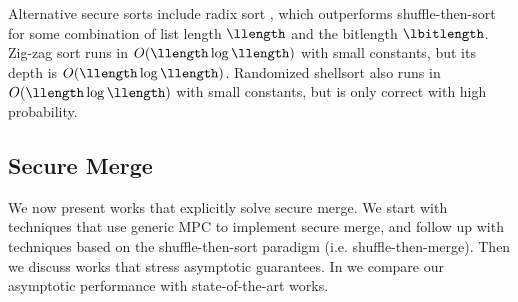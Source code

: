 


Alternative secure sorts include radix sort \cite{EPRINT:HICT14,EPRINT:CHIKKP19}, which outperforms shuffle-then-sort for some combination of list length $\llength$ and the bitlength $\lbitlength$. %
Zig-zag sort \cite{STOC:Goodrich14} runs in $O(\llength\log\llength)$ with small constants, but its depth is $O(\llength\log\llength)$.
Randomized shellsort \cite{SODA:Goodrich10} also runs in $O(\llength\log\llength)$ with small constants, but is only correct with high probability.


\subsection{Secure Merge}\label{sec:relworkmerging}

We now present works that explicitly solve secure merge.
We start with techniques that use generic MPC to implement secure merge, and follow up with techniques based on the shuffle-then-sort paradigm (i.e. shuffle-then-merge). Then we discuss works that stress asymptotic guarantees. %
In 
we compare our asymptotic performance with state-of-the-art works.


